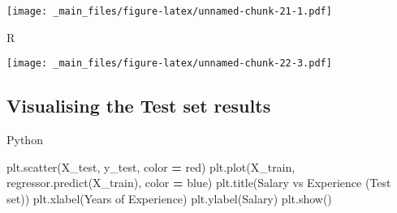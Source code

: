 \documentclass[
]{book}
\newenvironment{Shaded}{\begin{snugshade}}{\end{snugshade}}
\newcommand{\AttributeTok}[1]{\textcolor[rgb]{0.77,0.63,0.00}{#1}}
\newcommand{\CommentTok}[1]{\textcolor[rgb]{0.56,0.35,0.01}{\textit{#1}}}
\newcommand{\FunctionTok}[1]{\textcolor[rgb]{0.00,0.00,0.00}{#1}}
\newcommand{\NormalTok}[1]{#1}
\newcommand{\OperatorTok}[1]{\textcolor[rgb]{0.81,0.36,0.00}{\textbf{#1}}}
\newcommand{\SpecialCharTok}[1]{\textcolor[rgb]{0.00,0.00,0.00}{#1}}
\newcommand{\StringTok}[1]{\textcolor[rgb]{0.31,0.60,0.02}{#1}}
\theoremstyle{definition}
\theoremstyle{definition}
\theoremstyle{definition}
\theoremstyle{definition}
\theoremstyle{remark}
\begin{document}
\texttt{[image: \_main\_files/figure-latex/unnamed-chunk-21-1.pdf]}

R

\begin{Shaded}
\end{Shaded}

\texttt{[image: \_main\_files/figure-latex/unnamed-chunk-22-3.pdf]}

\hypertarget{visualising-the-test-set-results}{%
\subsection{Visualising the Test set results}\label{visualising-the-test-set-results}}

Python

\begin{Shaded}
\begin{Highlighting}[]
\NormalTok{plt.scatter(X\_test, y\_test, color }\OperatorTok{=} \StringTok{\textquotesingle{}red\textquotesingle{}}\NormalTok{)}
\NormalTok{plt.plot(X\_train, regressor.predict(X\_train), color }\OperatorTok{=} \StringTok{\textquotesingle{}blue\textquotesingle{}}\NormalTok{)}
\NormalTok{plt.title(}\StringTok{\textquotesingle{}Salary vs Experience (Test set)\textquotesingle{}}\NormalTok{)}
\NormalTok{plt.xlabel(}\StringTok{\textquotesingle{}Years of Experience\textquotesingle{}}\NormalTok{)}
\NormalTok{plt.ylabel(}\StringTok{\textquotesingle{}Salary\textquotesingle{}}\NormalTok{)}
\NormalTok{plt.show()}
\end{Highlighting}
\end{Shaded}
\end{document}
